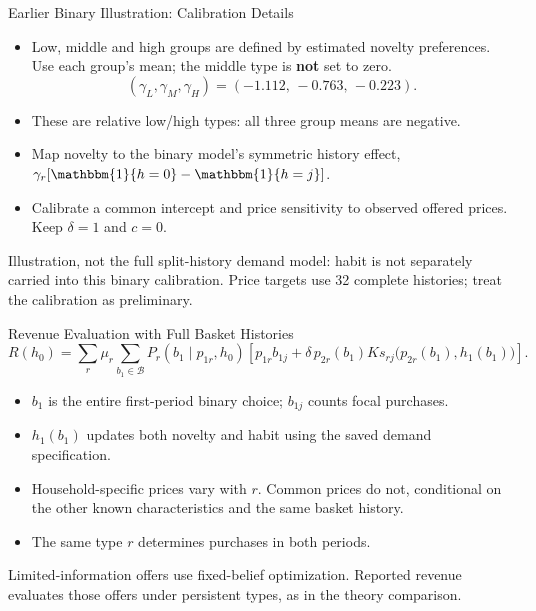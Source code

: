 \documentclass[aspectratio=169,professionalfonts]{beamer}
\newcommand{\shortbuttons}{}
\begin{document}
\gdef\shortbuttons{\hyperlink{short-34}{\beamergotobutton{Back}}}
\begin{frame}[label=short-35,noframenumbering]{Earlier Binary Illustration: Calibration Details}
  \begin{itemize}
    \item Low, middle and high groups are defined by estimated novelty preferences.
    Use each group's mean; the middle type is \textbf{not} set to zero.
    \[
      (\gamma_L,\gamma_M,\gamma_H)=(-1.112,\,-0.763,\,-0.223).
    \]
    \item These are relative low/high types: all three group means are negative.
    \item Map novelty to the binary model's symmetric history effect,
    $\gamma_r[\mathbbm{1}\{h=0\}-\mathbbm{1}\{h=j\}]$.
    \item Calibrate a common intercept and price sensitivity to observed offered prices.
    Keep $\delta=1$ and $c=0$.
  \end{itemize}
  \par\smallskip\footnotesize Illustration, not the full split-history demand model:
  habit is not separately carried into this binary calibration.
  Price targets use 32 complete histories; treat the calibration as preliminary.
\end{frame}

\gdef\shortbuttons{\hyperlink{short-40}{\beamergotobutton{Back}}}
\begin{frame}[label=short-42,noframenumbering]{Revenue Evaluation with Full Basket Histories}
  \small
  \[
    R(h_0)=\sum_r\mu_r\sum_{b_1\in\mathcal B}
      P_r(b_1\mid p_{1r},h_0)
      \left[p_{1r}b_{1j}
       +\delta\,p_{2r}(b_1)K s_{rj}\big(p_{2r}(b_1),h_1(b_1)\big)\right].
  \]
  \begin{itemize}
    \item $b_1$ is the entire first-period binary choice; $b_{1j}$ counts focal purchases.
    \item $h_1(b_1)$ updates both novelty and habit using the saved demand specification.
    \item Household-specific prices vary with $r$. Common prices do not, conditional
    on the other known characteristics and the same basket history.
    \item The same type $r$ determines purchases in both periods.
  \end{itemize}
  \begin{tcolorbox}
    Limited-information offers use fixed-belief optimization. Reported revenue
    evaluates those offers under persistent types, as in the theory comparison.
  \end{tcolorbox}
\end{frame}
\end{document}
